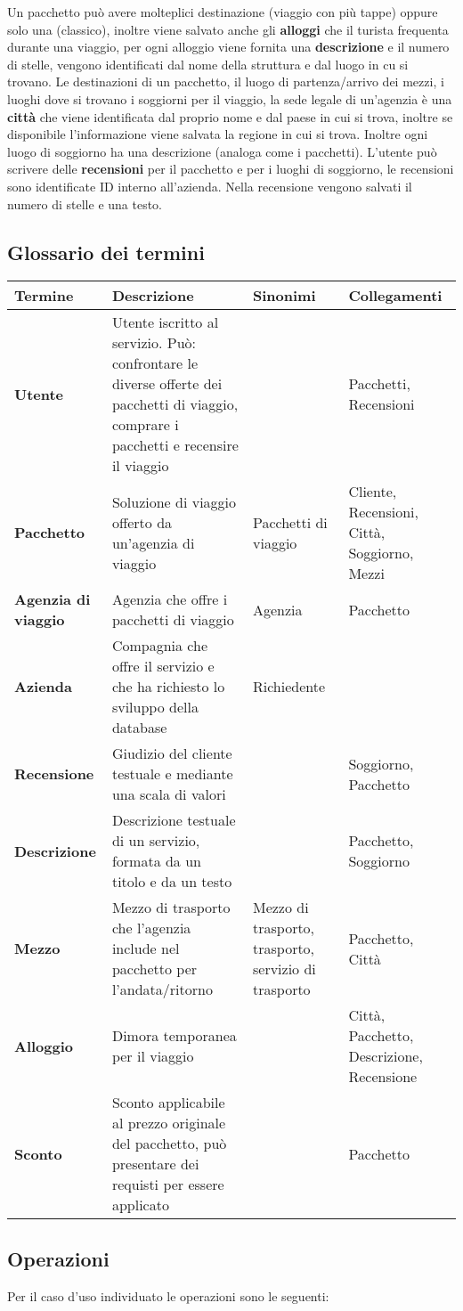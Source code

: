 %
Un pacchetto può avere molteplici destinazione (viaggio con più tappe) oppure solo una (classico), inoltre viene salvato anche gli \textbf{alloggi} che il turista frequenta durante una viaggio, per ogni alloggio viene fornita una \textbf{descrizione} e il numero di stelle, vengono identificati dal nome della struttura e dal luogo in cu si trovano.
%
Le destinazioni di un pacchetto, il luogo di partenza/arrivo dei mezzi, i luoghi dove si trovano i soggiorni per il viaggio, la sede legale di un'agenzia è una \textbf{città} che viene identificata dal proprio nome e dal paese in cui si trova, inoltre se disponibile l'informazione viene salvata la regione in cui si trova. Inoltre ogni luogo di soggiorno ha una descrizione (analoga come i pacchetti).
%
L'utente può scrivere delle \textbf{recensioni} per il pacchetto e per i luoghi di soggiorno, le recensioni sono identificate ID interno all'azienda. Nella recensione vengono salvati il numero di stelle e una testo.
%
\subsection{Glossario dei termini}
\begin{tabularx}{\textwidth}{p{} X p{} p{}}
    \toprule
    \textbf{Termine} & \textbf{Descrizione} & \textbf{Sinonimi} & \textbf{Collegamenti} \\
    \midrule
    \textbf{Utente} & Utente iscritto al servizio. Può: confrontare le diverse offerte dei pacchetti di viaggio, comprare i pacchetti e recensire il viaggio & & Pacchetti, Recensioni
    \\\midrule
    \textbf{Pacchetto} & Soluzione di viaggio offerto da un'agenzia di viaggio & Pacchetti di viaggio & Cliente, Recensioni, Città, Soggiorno, Mezzi
    \\\midrule
    \textbf{Agenzia di viaggio} & Agenzia che offre i pacchetti di viaggio & Agenzia & Pacchetto
    \\\midrule
    \textbf{Azienda} & Compagnia che offre il servizio e che ha richiesto lo sviluppo della database & Richiedente &
    \\\midrule
    \textbf{Recensione} & Giudizio del cliente testuale e mediante una scala di valori & & Soggiorno, Pacchetto
    \\\midrule
    \textbf{Descrizione} & Descrizione testuale di un servizio, formata da un titolo e da un testo & & Pacchetto, Soggiorno
    \\\midrule
    \textbf{Mezzo} & Mezzo di trasporto che l'agenzia include nel pacchetto per l'andata/ritorno & Mezzo di trasporto, trasporto, servizio di trasporto & Pacchetto, Città
    \\\midrule
    \textbf{Alloggio} & Dimora temporanea per il viaggio & & Città, Pacchetto, Descrizione, Recensione
    \\\midrule
    \textbf{Sconto} & Sconto applicabile al prezzo originale del pacchetto, può presentare dei requisti per essere applicato & & Pacchetto
    \\
    \bottomrule
\end{tabularx}

\subsection{Operazioni}
Per il caso d'uso individuato le operazioni sono le seguenti:

